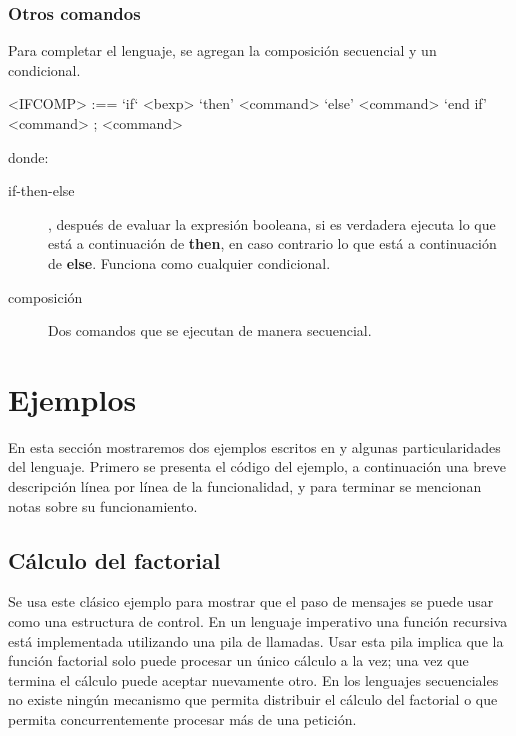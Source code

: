 \subsubsection*{Otros comandos}

Para completar el lenguaje, se agregan la composición secuencial y un condicional.

\begin{grammar}
  <IFCOMP> :== `if` <bexp> `then' <command> `else' <command> `end if'
  \alt <command> ; <command>
\end{grammar}

donde:

\begin{description}
\item [if-then-else], después de evaluar la expresión booleana, si es verdadera
  ejecuta lo que está a continuación de \textbf{then}, en caso contrario lo que está a
  continuación de \textbf{else}. Funciona como cualquier condicional.
\item [composición] Dos comandos que se ejecutan de manera secuencial.

\end{description}

\section{Ejemplos}

En esta sección mostraremos dos ejemplos escritos en \SAL y algunas particularidades del lenguaje. Primero se presenta el código del ejemplo, a continuación una breve descripción línea por línea de la funcionalidad, y para terminar se mencionan notas sobre su funcionamiento.

\subsection{Cálculo del factorial}\label{sal:factorial}

Se usa este clásico ejemplo para mostrar que el paso de mensajes se puede usar como una estructura de control. En un lenguaje imperativo una función recursiva está implementada utilizando una pila de llamadas. Usar esta pila implica que la función factorial solo puede procesar un único cálculo a la vez; una vez que termina el cálculo puede aceptar nuevamente otro. En los lenguajes secuenciales no existe ningún mecanismo que permita distribuir el cálculo del factorial o que permita concurrentemente procesar más de una petición.

